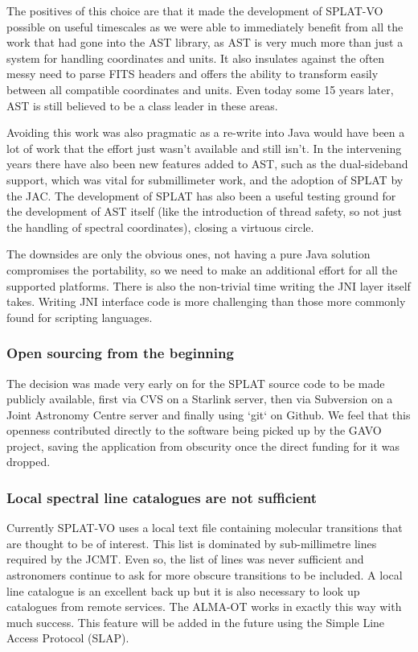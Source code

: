 \documentclass[final,authoryear,5p,times,twocolumn]{elsarticle}
\begin{document}
The positives of this choice are that it made the development of
SPLAT-VO possible on useful timescales as we were able to immediately
benefit from all the work that had gone into the AST library, as AST
is very much more than just a system for handling coordinates and
units. It also insulates against the often messy need to parse FITS
headers and offers the ability to transform easily between all
compatible coordinates and units. Even today some 15 years later, AST
is still believed to be a class leader in these areas.

Avoiding this work was also pragmatic as a re-write into Java would
have been a lot of work that the effort just wasn't available and
still isn't. In the intervening years there have also been new
features added to AST, such as the dual-sideband support, which was
vital for submillimeter work, and the adoption of SPLAT by the
JAC. The development of SPLAT has also been a useful testing ground
for the development of AST itself (like the introduction of thread
safety, so not just the handling of spectral coordinates), closing a
virtuous circle.

The downsides are only the obvious ones, not having a pure Java
solution compromises the portability, so we need to make an additional
effort for all the supported platforms. There is also the non-trivial
time writing the JNI layer itself takes. Writing JNI interface code is
more challenging than those more commonly found for scripting
languages.

\subsubsection{Open sourcing from the beginning}

The decision was made very early on for the SPLAT source code to be
made publicly available, first via CVS on a Starlink server, then via
Subversion on a Joint Astronomy Centre server and finally using `git`
on Github. We feel that this openness contributed directly to the
software being picked up by the GAVO project, saving the application
from obscurity once the direct funding for it was dropped.

\subsubsection{Local spectral line catalogues are not sufficient}

Currently SPLAT-VO uses a local text file containing molecular
transitions that are thought to be of interest. This list is dominated
by sub-millimetre lines required by the JCMT. Even so, the list of
lines was never sufficient and astronomers continue to ask for more
obscure transitions to be included. A local line catalogue is an
excellent back up but it is also necessary to look up catalogues from
remote services. The ALMA-OT \citep{2013ASPC..475..373W} works in
exactly this way with much success. This feature will be added in the
future using the Simple Line Access Protocol (SLAP).
\end{document}
